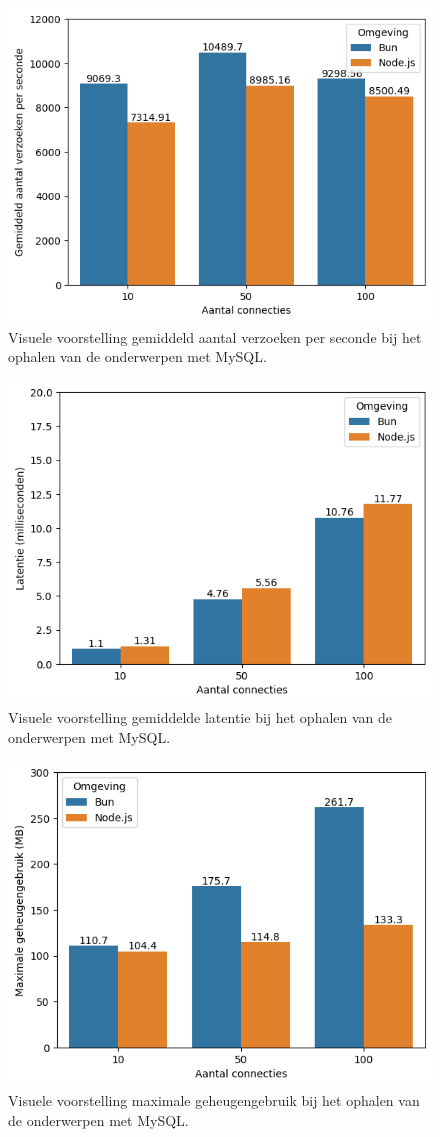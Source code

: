   \begin{figure}[H]
    \centering
    \includegraphics[width=0.7\columnwidth]{graphics/GetMySqlVerzoeken.png}
    \caption[Aantal verzoeken per seconde GET verzoek met MySQL]{\label{fig:getaantalverzoekenmysql}Visuele voorstelling gemiddeld aantal verzoeken per seconde bij het ophalen van de onderwerpen met MySQL.}
  \end{figure}
  \begin{figure}[H]
    \centering
    \includegraphics[width=0.7\columnwidth]{graphics/GetMySqlLatentie.png}
    \caption[Latentie GET verzoek met MySQL]{\label{fig:getaantallatentienmysql}Visuele voorstelling gemiddelde latentie bij het ophalen van de onderwerpen met MySQL.}
  \end{figure}
  \begin{figure}[H]
    \centering
    \includegraphics[width=0.7\columnwidth]{graphics/GetMySqlRAM.png}
    \caption[Geheugengebruik GET verzoek met MySQL]{\label{fig:getgeheugenmysql}Visuele voorstelling maximale geheugengebruik bij het ophalen van de onderwerpen met MySQL.}
  \end{figure}
